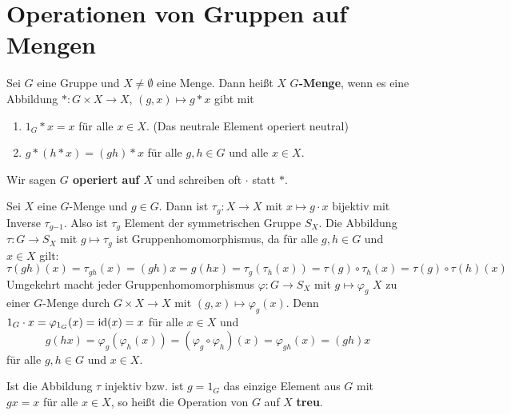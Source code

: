 \section{Operationen von Gruppen auf Mengen}
\begin{definition}
	Sei $G$ eine Gruppe und $X \neq \emptyset$ eine Menge. Dann heißt $X$ \textbf{$G$-Menge}, wenn es eine Abbildung $* \colon G \times X \to X$, $(g,x) \mapsto g*x$ gibt mit 
		\begin{enumerate}[label={\bfseries(O\arabic*)}]
		\item\label{opr1} $1_G * x = x$ für alle $x \in X$. (Das neutrale Element operiert neutral)
		\item\label{opr2} $g * (h * x) = (gh)*x$ für alle $g, h \in G$ und alle $x \in X$.
	\end{enumerate} 
	Wir sagen \textbf{$G$ operiert auf $X$} und schreiben oft $\cdot$ statt $*$.
\end{definition}
\begin{rem}\label{rem3_2}
	Sei $X$ eine $G$-Menge und $g \in G$. Dann ist $\tau_g \colon X \to X$ mit $x \mapsto g\cdot x$ bijektiv mit Inverse $\tau_{g{-1}}$. Also ist $\tau_g$ Element der symmetrischen Gruppe $S_X$. Die Abbildung $\tau \colon G \to S_X$ mit $g \mapsto \tau_g$ ist Gruppenhomomorphismus, da für alle $g, h \in G$ und $x \in X$ gilt:
	\[\tau(gh)(x) = \tau_{gh}(x) = (gh) x = g(hx) = \tau_g(\tau_h(x)) = \tau(g) \circ \tau_h(x) = \tau(g) \circ \tau(h)(x)\]
	Umgekehrt macht jeder Gruppenhomomorphismus $\varphi \colon G \to S_X$ mit $g \mapsto \varphi_g$ $X$ zu einer $G$-Menge durch $G \times X \to X$ mit $(g,x) \mapsto \varphi_g(x)$. Denn $1_G \cdot x = \varphi_{1_G}(x) = \mathrm{id}(x) = x$ für alle $x \in X$ und 
	\[g(hx) = \varphi_g(\varphi_h(x)) = (\varphi_g \circ \varphi_h)(x) = \varphi_{gh}(x) = (gh)x\]
	für alle $g,h \in G$ und $x \in X$.
\end{rem}

Ist die Abbildung $\tau$ injektiv bzw. ist $g = 1_G$ das einzige Element aus $G$ mit $gx = x$ für alle $x \in X$, so heißt die Operation von $G$ auf $X$ \textbf{treu}.

